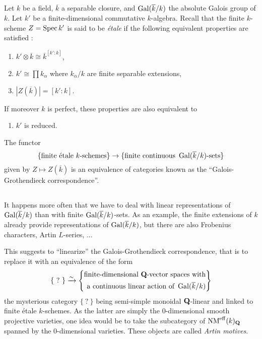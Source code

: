 \documentclass[../main.tex]{subfiles}
\begin{document}
\subsection{} Let $k$ be a field, $\overline{k}$ a separable closure, and $\operatorname{Gal}(\overline{k}/k)$ the absolute Galois group of $k$.
Let $k'$ be a finite-dimensional commutative $k$-algebra.
Recall that the finite $k$-scheme $Z = \operatorname{Spec} k'$ is said to be \emph{étale} if the following equivalent properties are satisfied :
\begin{enumerate}[label=(\roman*)]
    \item $k' \otimes \overline{k} \cong \overline{k}^{[k' : k]}$,
    \item $k' \cong \prod k_{\alpha}$ where $k_{\alpha}/k$ are finite separable extensions,
    \item $|Z(\overline{k})| = [k' : k]$.
\end{enumerate}
If moreover $k$ is perfect, these properties are also equivalent to
\begin{enumerate}[resume, label=(\roman*)]
    \item $k'$ is reduced.
\end{enumerate}

The functor
$$\{\text{finite étale }k\text{-schemes}\} \to \{\text{finite continuous }\operatorname{Gal}(\overline{k}/k)\text{-sets}\}$$
given by $Z \mapsto Z(\overline{k})$ is an equivalence of categories known as the \enquote{Galois-Grothendieck correspondence}.

\subsection{} It happens more often that we have to deal with linear representations of $\operatorname{Gal}(\overline{k}/k)$ than with finite $\operatorname{Gal}(\overline{k}/k)$-sets.
As an example, the finite extensions of $k$ already provide representations of $\operatorname{Gal}(\overline{k}/k)$, but there are also Frobenius characters, Artin $L$-series, ...

This suggests to \enquote{linearize} the Galois-Grothendieck correspondence, that is to replace it with an equivalence of the form
$$
    \{\ ?\ \}
    \xrightarrow{\sim}
    \left\{\begin{aligned}\text{finite-dimensional }\mathbf{Q}\text{-vector spaces with}\\
    \text{a continuous linear action of }\operatorname{Gal}(\overline{k}/k)\end{aligned}\right\}
$$
the mysterious category $\{\ ?\ \}$ being semi-simple monoidal $\mathbf{Q}$-linear and linked to finite étale $k$-schemes.
As the latter are simply the $0$-dimensional smooth projective varieties, one idea would be to take the subcategory of $\operatorname{NM}^{\mathrm{eff}}(k)_{\mathbf{Q}}$ spanned by the $0$-dimensional varieties. These objects are called \emph{Artin motives}.
\end{document}
